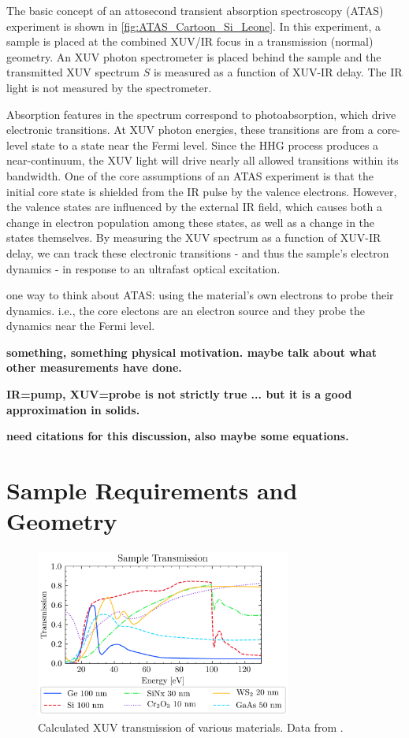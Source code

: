The basic concept of an attosecond transient absorption spectroscopy (ATAS) experiment is shown in \cref{fig:ATAS_Cartoon_Si_Leone}. In this experiment, a sample is placed at the combined XUV/IR focus in a transmission (normal) geometry. An XUV photon spectrometer is placed behind the sample and the transmitted XUV spectrum $S$ is measured as a function of XUV-IR delay. The IR light is not measured by the spectrometer.

Absorption features in the spectrum correspond to photoabsorption, which drive electronic transitions. At XUV photon energies, these transitions are from a core-level state to a state near the Fermi level. Since the HHG process produces a near-continuum, the XUV light will drive nearly all allowed transitions within its bandwidth. One of the core assumptions of an ATAS experiment is that the initial core state is shielded from the IR pulse by the valence electrons. However, the valence states are influenced by the external IR field, which causes both a change in electron population among these states, as well as a change in the states themselves. By measuring the XUV spectrum as a function of XUV-IR delay, we can track these electronic transitions - and thus the sample's electron dynamics - in response to an ultrafast optical excitation.

one way to think about ATAS: using the material's own electrons to probe their dynamics. i.e., the core electons are an electron source and they probe the dynamics near the Fermi level.

\textbf{something, something physical motivation. maybe talk about what other measurements have done.}

\textbf{IR=pump, XUV=probe is not strictly true ... but it is a good approximation in solids.}

\textbf{need citations for this discussion, also maybe some equations.}

\section{Sample Requirements and Geometry}

\begin{figure}
	\centering
	\includegraphics[width=0.75\textwidth]{figures/chap3/Sample_trans_CXRO.png}
	\caption{Calculated XUV transmission of various materials. Data from \cite{gulliksonCXROXRayInteractions}.}
	\label{fig:Sample_trans_CXRO}
\end{figure}

